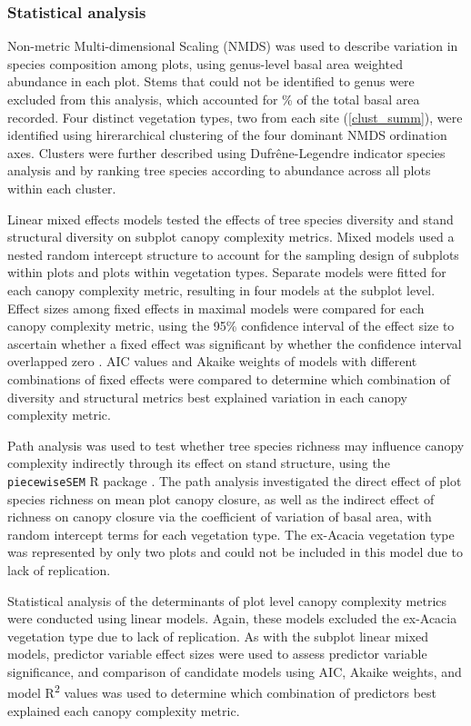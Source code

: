 \documentclass[11pt,a4paper]{article}
\begin{document}
\subsubsection{Statistical analysis}

Non-metric Multi-dimensional Scaling (NMDS) was used to describe variation in species composition among plots, using genus-level basal area weighted abundance in each plot. Stems that could not be identified to genus were excluded from this analysis, which accounted for \perIndet{}\% of the total basal area recorded. Four distinct vegetation types, two from each site (\autoref{clust_summ}), were identified using hirerarchical clustering of the four dominant NMDS ordination axes. Clusters were further described using Dufr\^{e}ne-Legendre indicator species analysis and by ranking tree species according to abundance across all plots within each cluster.

Linear mixed effects models tested the effects of tree species diversity and stand structural diversity on subplot canopy complexity metrics. Mixed models used a nested random intercept structure to account for the sampling design of subplots within plots and plots within vegetation types. Separate models were fitted for each canopy complexity metric, resulting in four models at the subplot level. Effect sizes among fixed effects in maximal models were compared for each canopy complexity metric, using the 95\% confidence interval of the effect size to ascertain whether a fixed effect was significant by whether the confidence interval overlapped zero \citep{Nakagawa2007}. AIC values and Akaike weights of models with different combinations of fixed effects were compared to determine which combination of diversity and structural metrics best explained variation in each canopy complexity metric. 

Path analysis was used to test whether tree species richness may influence canopy complexity indirectly through its effect on stand structure, using the \texttt{piecewiseSEM} R package \citep{piecewiseSEM}. The path analysis investigated the direct effect of plot species richness on mean plot canopy closure, as well as the indirect effect of richness on canopy closure via the coefficient of variation of basal area, with random intercept terms for each vegetation type. The ex-Acacia vegetation type was represented by only two plots and could not be included in this model due to lack of replication.

Statistical analysis of the determinants of plot level canopy complexity metrics were conducted using linear models. Again, these models excluded the ex-Acacia vegetation type due to lack of replication. As with the subplot linear mixed models, predictor variable effect sizes were used to assess predictor variable significance, and comparison of candidate models using AIC, Akaike weights, and model R\textsuperscript{2} values was used to determine which combination of predictors best explained each canopy complexity metric.
\end{document}
